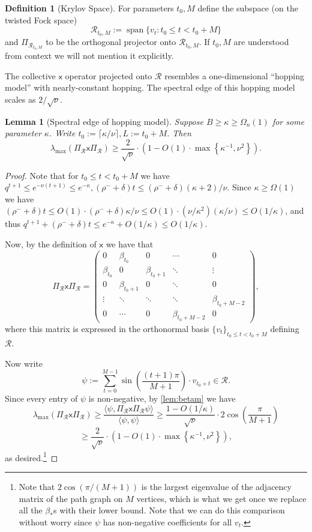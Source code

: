 \documentclass
[11pt,letterpaper]
{article}
\newtheorem{lemma}[theorem]{Lemma}
\theoremstyle{definition}
\newtheorem{definition}[theorem]{Definition}
\newcommand{\sfx}{\mathsf x}
\newcommand{\1}{\mathbf{1}}
\newcommand{\spn}{\operatorname{span}}
\newcommand{\cR}{\mathcal R}
\renewcommand{\geq}{\geqslant}
\renewcommand{\leq}{\leqslant}
\begin{document}
 \begin{definition}[Krylov Space]\label{defn:relevant-subspace}
 For parameters $t_0, M$ define the subspace (on the twisted Fock space)
\begin{equation}
    \cR_{t_0, M}:= \spn\{v_t: t_0\leq t < t_0 + M\}
\end{equation}
and $\Pi_{\cR_{t_0, M}}$ to be the orthogonal projector onto $\cR_{t_0, M}$. If $t_0, M$ are understood from context we will not mention it explicitly.
 \end{definition}
 The collective $\sfx$ operator projected onto $\cR$ resembles a one-dimensional ``hopping model'' with nearly-constant hopping. The spectral edge of this hopping model scales as $2/\sqrt{\nu}$.
\begin{lemma}[Spectral edge of hopping model]\label{lem:x-large-eig}
     Suppose $B\geq\kappa\geq\Omega_n(1)$ for some parameter $\kappa$. Write $t_0:= \lceil \kappa/\nu\rceil, L:= t_0 + M$. Then 
    \[\lambda_{\max}\left(\Pi_\cR \sfx \Pi_\cR\right)\geq\frac{2}{\sqrt{\nu}}\cdot\left(1 - O(1)\cdot\max\left\{\kappa^{-1}, \nu^2\right\}\right).\]
\end{lemma}
\begin{proof}
    Note that for $t_0\leq t < t_0 + M$ we have $q^{t + 1}\leq e^{-\nu(t + 1)}\leq e^{-\kappa}, (\rho^- + \delta)t\leq (\rho^- + \delta)(\kappa + 2)/\nu$. Since $\kappa\geq\Omega(1)$ we have $(\rho^- + \delta)t\leq O(1)\cdot(\rho^- + \delta)\kappa/\nu\leq O(1)\cdot(\nu/\kappa^2)(\kappa/\nu)\leq O(1/\kappa)$, and thus $q^{t + 1} + (\rho^- + \delta)t\leq e^{-\kappa} + O(1/\kappa)\leq O(1/\kappa)$.
    
    Now, by the definition of $\sfx$ we have that 
\[\Pi_\cR \sfx\Pi_\cR = 
\begin{pmatrix}
0 & \beta_{t_0} & 0 & \cdots & 0 \\
\beta_{t_0} & 0 & \beta_{t_0+1} & \ddots & \vdots \\
0 & \beta_{t_0+1} & 0 & \ddots & 0 \\
\vdots & \ddots & \ddots & \ddots & \beta_{t_0+M-2} \\
0 & \cdots & 0 & \beta_{t_0+M-2} & 0
\end{pmatrix},
\]
where this matrix is expressed in the orthonormal basis $\{v_t\}_{t_0\leq t < t_0 + M}$ defining $\cR$.

Now write 
\[\psi:= \sum_{t = 0}^{M - 1}\sin\left(\frac{(t + 1)\pi}{M + 1}\right)\cdot v_{t_0 + t}\in\cR.\]
Since every entry of $\psi$ is non-negative, by \cref{lem:betam} we have 
\[\lambda_{\max}\left(\Pi_\cR \sfx\Pi_\cR\right)\geq\frac{\langle\psi,\Pi_\cR \sfx\Pi_\cR\psi\rangle}{\langle\psi, \psi\rangle}\geq \frac{1 - O(1/\kappa)}{\sqrt{\nu}}\cdot 2\cos\left(\frac{\pi}{M + 1}\right)\] 
\[\geq\frac{2}{\sqrt{\nu}}\cdot\left(1 - O(1)\cdot\max\left\{\kappa^{-1}, \nu^2\right\}\right),\]
as desired.\footnote{Note that $2\cos(\pi/(M + 1))$ is the largest eigenvalue of the adjacency matrix of the path graph on $M$ vertices, which is what we get once we replace all the $\beta_\ast$s with their lower bound. Note that we can do this comparison without worry since $\psi$ has non-negative coefficients for all $v_t$.}
\end{proof}
\end{document}
